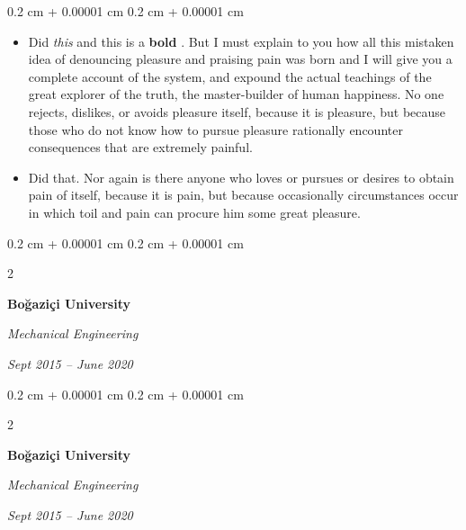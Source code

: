 \documentclass[10pt, letterpaper]{article}
\newenvironment{highlights}{
    \begin{itemize}[
        topsep=0.10 cm,
        parsep=0.10 cm,
        partopsep=0pt,
        itemsep=0pt,
        leftmargin=0.4 cm + 10pt
    ]
}{
    \end{itemize}
} %
\newenvironment{onecolentry}{
    \begin{adjustwidth}{
        0.2 cm + 0.00001 cm
    }{
        0.2 cm + 0.00001 cm
    }
}{
    \end{adjustwidth}
} %
\newenvironment{twocolentry}[2][]{
    \onecolentry
    \def\secondColumn{#2}
    \setcolumnwidth{\fill, 4.5 cm}
    \begin{paracol}{2}
}{
    \switchcolumn \raggedleft \secondColumn
    \end{paracol}
    \endonecolentry
} %
\let\hrefWithoutArrow\href
\renewcommand{\href}[2]{\hrefWithoutArrow{#1}{\ifthenelse{\equal{#2}{}}{ }{#2 }\raisebox{.15ex}{\footnotesize \faExternalLink*}}}
\begin{document}
        \vspace{0.10 cm}
        \begin{onecolentry}
            \begin{highlights}
                \item Did \textit{this} and this is a \textbf{bold} \href{https://example.com}{link}. But I must explain to you how all this mistaken idea of denouncing pleasure and praising pain was born and I will give you a complete account of the system, and expound the actual teachings of the great explorer of the truth, the master-builder of human happiness. No one rejects, dislikes, or avoids pleasure itself, because it is pleasure, but because those who do not know how to pursue pleasure rationally encounter consequences that are extremely painful.
                \item Did that. Nor again is there anyone who loves or pursues or desires to obtain pain of itself, because it is pain, but because occasionally circumstances occur in which toil and pain can procure him some great pleasure.
            \end{highlights}
        \end{onecolentry}


        \vspace{0.2 cm}

        \begin{twocolentry}{
            
            
        \textit{Sept 2015 – June 2020}}
            \textbf{Boğaziçi University}

            \textit{Mechanical Engineering}
        \end{twocolentry}



        \vspace{0.2 cm}

        \begin{twocolentry}{
            
            
        \textit{Sept 2015 – June 2020}}
            \textbf{Boğaziçi University}

            \textit{Mechanical Engineering}
        \end{twocolentry}
\end{document}

